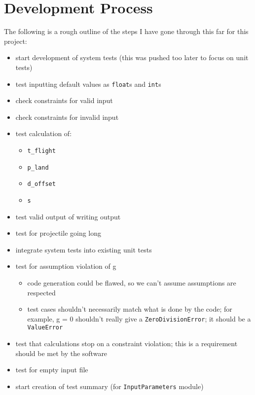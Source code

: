 \chapter{Development Process}
\label{chap:development-process}

The following is a rough outline of the steps I have gone through this far for
this project:

\begin{itemize}
    \item start development of system tests (this was pushed too later to focus
          on unit tests)
    \item test inputting default values as \texttt{float}s and \texttt{int}s
    \item check constraints for valid input
    \item check constraints for invalid input
    \item test calculation of:
          \begin{itemize}
              \item \texttt{t\_flight}
              \item \texttt{p\_land}
              \item \texttt{d\_offset}
              \item \texttt{s}
          \end{itemize}
    \item test valid output of writing output
    \item test for projectile going long
    \item integrate system tests into existing unit tests
    \item test for assumption violation of g
          \begin{itemize}
              \item code generation could be flawed, so we can't assume
                    assumptions are respected
              \item test cases shouldn't necessarily match what is done by the
                    code; for example, g = 0 shouldn't really give a
                    \texttt{ZeroDivisionError}; it should be a \texttt{ValueError}
          \end{itemize}
    \item test that calculations stop on a constraint violation; this is a
          requirement should be met by the software
    \item test for empty input file
    \item start creation of test summary (for \texttt{InputParameters} module)

\end{itemize}
